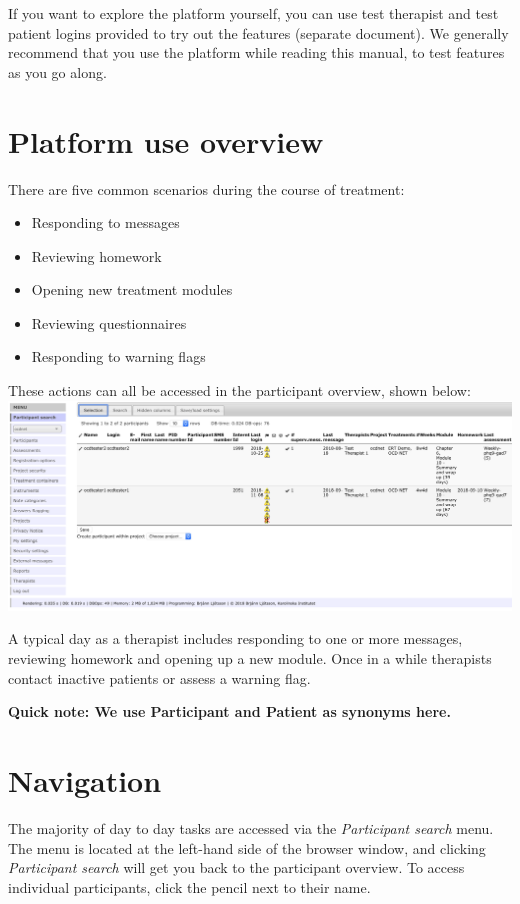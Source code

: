 \documentclass[]{book}
\providecommand{\tightlist}{%
  \setlength{\itemsep}{0pt}\setlength{\parskip}{0pt}}
\theoremstyle{definition}
\theoremstyle{definition}
\theoremstyle{definition}
\theoremstyle{remark}
\begin{document}
If you want to explore the platform yourself, you can use test therapist
and test patient logins provided to try out the features (separate
document). We generally recommend that you use the platform while
reading this manual, to test features as you go along.

\hypertarget{platform-use-overview}{%
\section{Platform use overview}\label{platform-use-overview}}

There are five common scenarios during the course of treatment:

\begin{itemize}
\tightlist
\item
  Responding to messages
\item
  Reviewing homework
\item
  Opening new treatment modules
\item
  Reviewing questionnaires
\item
  Responding to warning flags
\end{itemize}

These actions can all be accessed in the participant overview, shown
below: \includegraphics{images/participant-overview.png}

A typical day as a therapist includes responding to one or more
messages, reviewing homework and opening up a new module. Once in a
while therapists contact inactive patients or assess a warning flag.

\textbf{Quick note: We use Participant and Patient as synonyms here.}

\hypertarget{navigation}{%
\section{Navigation}\label{navigation}}

The majority of day to day tasks are accessed via the \emph{Participant
search} menu. The menu is located at the left-hand side of the browser
window, and clicking \emph{Participant search} will get you back to the
participant overview. To access individual participants, click the
pencil next to their name.
\end{document}
